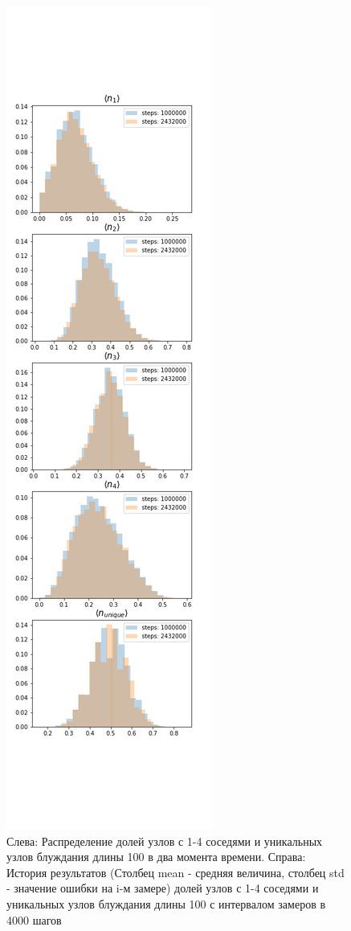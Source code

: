 \begin{figure}
	\caption{Слева: Распределение долей узлов с 1-4 соседями и уникальных узлов блуждания длины 100 в два момента времени. Справа: История результатов (Столбец mean - средняя величина, столбец std - значение ошибки на i-м замере) долей узлов с 1-4 соседями и уникальных узлов блуждания длины 100 с интервалом замеров в 4000 шагов}
     \label{fig:DS_100_dists_history}
\begin{minipage}{0.32\textwidth}
     \includegraphics[width=\textwidth]{Sections/Images_2/DS_100_dists.png}

\end{minipage}
\end{figure}
